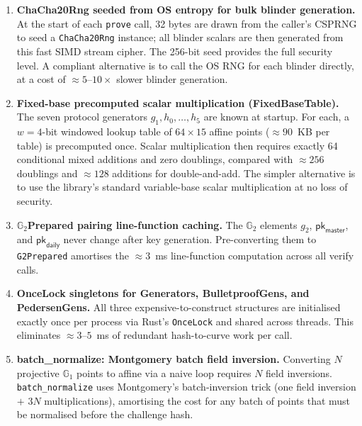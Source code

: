\documentclass[11pt]{article}
\theoremstyle{definitionstyle}
\theoremstyle{plain}
\begin{document}
\begin{enumerate}[leftmargin=*,label=\textbf{O\arabic*.}]

\item \textbf{ChaCha20Rng seeded from OS entropy for bulk blinder generation.}
  At the start of each \texttt{prove} call, 32 bytes are drawn from the
  caller's CSPRNG to seed a \texttt{ChaCha20Rng} instance; all blinder
  scalars are then generated from this fast SIMD stream cipher.  The 256-bit
  seed provides the full security level.  A compliant alternative is to call
  the OS RNG for each blinder directly, at a cost of $\approx 5$--$10\times$
  slower blinder generation.

\item \textbf{Fixed-base precomputed scalar multiplication (FixedBaseTable).}
  The seven protocol generators $g_1, h_0, \ldots, h_5$ are known at startup.
  For each, a $w=4$-bit windowed lookup table of $64 \times 15$ affine points
  ($\approx 90$~KB per table) is precomputed once.  Scalar multiplication
  then requires exactly 64 conditional mixed additions and zero doublings,
  compared with $\approx 256$ doublings and $\approx 128$ additions for
  double-and-add.  The simpler alternative is to use the library's standard
  variable-base scalar multiplication at no loss of security.

\item \textbf{$\mathbb{G}_2$Prepared pairing line-function caching.}
  The $\mathbb{G}_2$ elements $g_2$, $\mathsf{pk}_{\mathsf{master}}$, and
  $\mathsf{pk}_{\mathsf{daily}}$ never change after key generation.
  Pre-converting them to \texttt{G2Prepared} amortises the $\approx 3$~ms
  line-function computation across all verify calls.

\item \textbf{OnceLock singletons for Generators, BulletproofGens, and PedersenGens.}
  All three expensive-to-construct structures are initialised exactly once
  per process via Rust's \texttt{OnceLock} and shared across threads.  This
  eliminates $\approx 3$--$5$~ms of redundant hash-to-curve work per call.

\item \textbf{batch\_normalize: Montgomery batch field inversion.}
  Converting $N$ projective $\mathbb{G}_1$ points to affine via a naive loop
  requires $N$ field inversions.  \texttt{batch\_normalize} uses Montgomery's
  batch-inversion trick (one field inversion $+$ $3N$ multiplications),
  amortising the cost for any batch of points that must be normalised before
  the challenge hash.


\end{enumerate}
\end{document}
